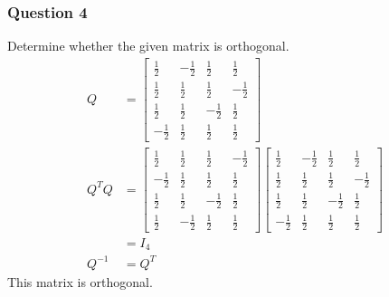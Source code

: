 \documentclass{math}
\begin{document}
\subsubsection*{Question 4}
Determine whether the given matrix is orthogonal.
\begin{align*}
  Q &= \begin{bmatrix}
    \frac{1}{2} & -\frac{1}{2} & \frac{1}{2} & \frac{1}{2} \\
    \frac{1}{2} & \frac{1}{2} & \frac{1}{2} & -\frac{1}{2} \\
    \frac{1}{2} & \frac{1}{2} & -\frac{1}{2} & \frac{1}{2} \\
    -\frac{1}{2} & \frac{1}{2} & \frac{1}{2} & \frac{1}{2}
  \end{bmatrix} \\
  Q^TQ &= \begin{bmatrix}
    \frac{1}{2} & \frac{1}{2} & \frac{1}{2} & -\frac{1}{2} \\
    -\frac{1}{2} & \frac{1}{2} & \frac{1}{2} & \frac{1}{2} \\
    \frac{1}{2} & \frac{1}{2} & -\frac{1}{2} & \frac{1}{2} \\
    \frac{1}{2} & -\frac{1}{2} & \frac{1}{2} & \frac{1}{2}
  \end{bmatrix}\begin{bmatrix}
    \frac{1}{2} & -\frac{1}{2} & \frac{1}{2} & \frac{1}{2} \\
    \frac{1}{2} & \frac{1}{2} & \frac{1}{2} & -\frac{1}{2} \\
    \frac{1}{2} & \frac{1}{2} & -\frac{1}{2} & \frac{1}{2} \\
    -\frac{1}{2} & \frac{1}{2} & \frac{1}{2} & \frac{1}{2}
  \end{bmatrix} \\
  &= I_4 \\
  Q^{-1} &= Q^T
\end{align*}
This matrix is orthogonal.
\end{document}
